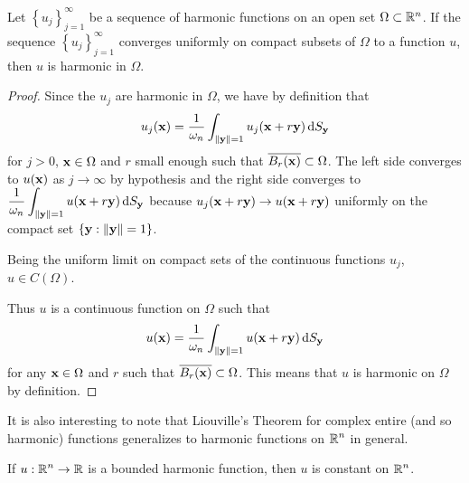 \begin{cor} \label{UnifConvHarm}
Let $\displaystyle \left\{ u_j \right\}_{j=1}^\infty$ be a sequence of
harmonic functions on an open set $\Omega \subset \mathbb{R}^n$.  If the sequence
$\displaystyle \left\{ u_j \right\}_{j=1}^\infty$ converges uniformly
on compact subsets of $\Omega$ to a function $u$, then $u$ is harmonic
in $\Omega$.
\end{cor}

\begin{proof}
Since the $u_j$ are harmonic in $\Omega$, we have by
definition that
\[
u_j(\mathbf{x}) = \frac{1}{\omega_n} \int_{\|\mathbf{y}\|=1}
u_j(\mathbf{x}+r\mathbf{y}) \,\mathrm{d}{S}_{\mathbf{y}}
\]
for $j>0$, $\mathbf{x}\in \Omega$ and $r$ small enough such that
$\overline{B_r(\mathbf{x})} \subset \Omega$.  The left side converges to
$u(\mathbf{x})$ as $j\rightarrow \infty$ by hypothesis and the right side
converges to $\displaystyle \frac{1}{\omega_n} \int_{\|\mathbf{y}\|=1}
u(\mathbf{x}+r\mathbf{y}) \,\mathrm{d}{S}_{\mathbf{y}}$ because 
$u_j(\mathbf{x}+r\mathbf{y}) \rightarrow u(\mathbf{x}+r\mathbf{y})$ uniformly
on the compact set $\{ \mathbf{y} : \|\mathbf{y}\|=1\}$.

Being the uniform limit on compact sets of the continuous functions
$u_j$, $u\in C(\Omega)$.

Thus $u$ is a continuous function on $\Omega$ such that
\[
u(\mathbf{x}) = \frac{1}{\omega_n} \int_{\|\mathbf{y}\|=1}
u(\mathbf{x}+r\mathbf{y}) \,\mathrm{d}{S}_{\mathbf{y}}
\]
for any $\mathbf{x} \in \Omega$ and $r$ such that
$\overline{B_r(\mathbf{x})} \subset \Omega$.  This means that $u$ is
harmonic on $\Omega$ by definition.
\end{proof}

It is also interesting to note that Liouville's Theorem for complex
entire (and so harmonic) functions generalizes to harmonic
functions on $\displaystyle \mathbb{R}^n$ in general.

\begin{theorem}
If $\displaystyle u:\mathbb{R}^n \rightarrow \mathbb{R}$ is a bounded harmonic
function, then $u$ is constant on $\displaystyle \mathbb{R}^n$.
\end{theorem}

